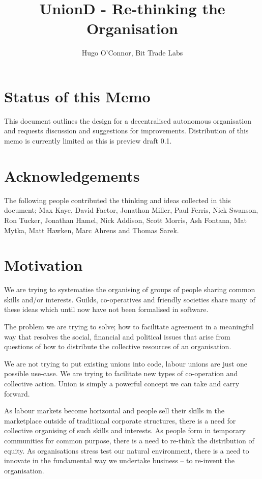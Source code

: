 \documentclass[12pt,twocolumn]{article}
\begin{document}
\title{UnionD - Re-thinking the Organisation}
\author{Hugo O'Connor, Bit Trade Labs}
\maketitle
\tableofcontents
\newpage
\section {Status of this Memo}

This document outlines the design for a decentralised autonomous organisation and requests discussion and suggestions for improvements. Distribution of this memo is currently limited as this is preview draft 0.1.

\section {Acknowledgements}

The following people contributed the thinking and ideas collected in this document; Max Kaye, David Factor, Jonathon Miller, Paul Ferris, Nick Swanson, Ron Tucker, Jonathan Hamel, Nick Addison, Scott Morris, Ash Fontana, Mat Mytka, Matt Hawken, Marc Ahrens and Thomas Sarek.

\section {Motivation}

We are trying to systematise the organising of groups of people sharing common skills and/or interests. Guilds, co-operatives and friendly societies share many of these ideas which until now have not been formalised in software.

The problem we are trying to solve; how to facilitate agreement in a meaningful way that resolves the social, financial and political issues that arise from questions of how to distribute the collective resources of an organisation.

We are not trying to put existing unions into code, labour unions are just one possible use-case. We are trying to facilitate new types of co-operation and collective action. Union is simply a powerful concept we can take and carry forward.

As labour markets become horizontal and people sell their skills in the marketplace outside of traditional corporate structures, there is a need for collective organising of such skills and interests. As people form in temporary communities for common purpose, there is a need to re-think the distribution of equity. As organisations stress test our natural environment, there is a need to innovate in the fundamental way we undertake business -- to re-invent the organisation.
\end{document}
